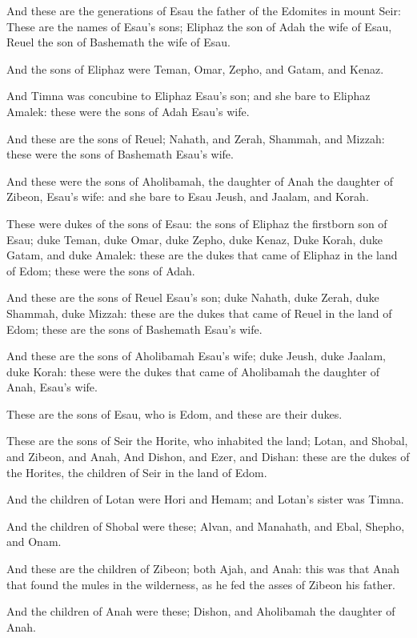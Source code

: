 \verse And these are the generations of Esau the father of the Edomites in mount Seir: \verse These are the names of Esau's sons; Eliphaz the son of Adah the wife of Esau, Reuel the son of Bashemath the wife of Esau.

\verse And the sons of Eliphaz were Teman, Omar, Zepho, and Gatam, and Kenaz.

\verse And Timna was concubine to Eliphaz Esau's son; and she bare to Eliphaz Amalek: these were the sons of Adah Esau's wife.

\verse And these are the sons of Reuel; Nahath, and Zerah, Shammah, and Mizzah: these were the sons of Bashemath Esau's wife.

\verse And these were the sons of Aholibamah, the daughter of Anah the daughter of Zibeon, Esau's wife: and she bare to Esau Jeush, and Jaalam, and Korah.

\verse These were dukes of the sons of Esau: the sons of Eliphaz the firstborn son of Esau; duke Teman, duke Omar, duke Zepho, duke Kenaz, \verse Duke Korah, duke Gatam, and duke Amalek: these are the dukes that came of Eliphaz in the land of Edom; these were the sons of Adah.

\verse And these are the sons of Reuel Esau's son; duke Nahath, duke Zerah, duke Shammah, duke Mizzah: these are the dukes that came of Reuel in the land of Edom; these are the sons of Bashemath Esau's wife.

\verse And these are the sons of Aholibamah Esau's wife; duke Jeush, duke Jaalam, duke Korah: these were the dukes that came of Aholibamah the daughter of Anah, Esau's wife.

\verse These are the sons of Esau, who is Edom, and these are their dukes.

\verse These are the sons of Seir the Horite, who inhabited the land; Lotan, and Shobal, and Zibeon, and Anah, \verse And Dishon, and Ezer, and Dishan: these are the dukes of the Horites, the children of Seir in the land of Edom.

\verse And the children of Lotan were Hori and Hemam; and Lotan's sister was Timna.

\verse And the children of Shobal were these; Alvan, and Manahath, and Ebal, Shepho, and Onam.

\verse And these are the children of Zibeon; both Ajah, and Anah: this was that Anah that found the mules in the wilderness, as he fed the asses of Zibeon his father.

\verse And the children of Anah were these; Dishon, and Aholibamah the daughter of Anah.

